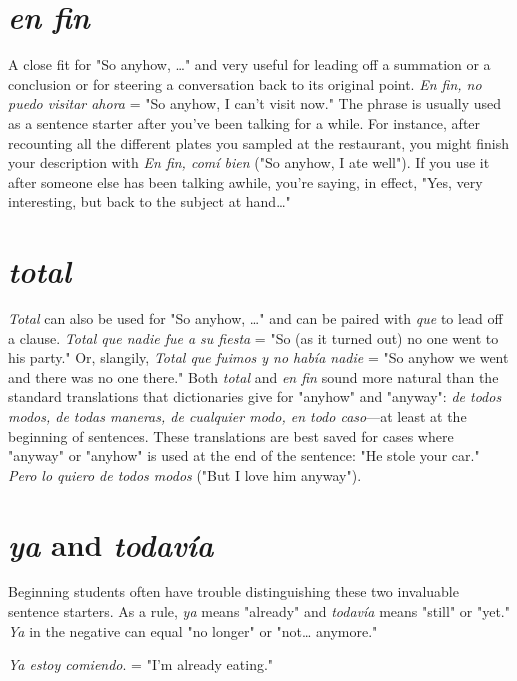 \section{\emph{en fin}}

A close fit for "So anyhow, \ldots{}" and very useful for leading off
a summation or a conclusion or for steering a conversation back to its
original point. \emph{En fin, no puedo visitar ahora} = "So anyhow, I can't
visit now." The phrase is usually used as a sentence starter after you've
been talking for a while. For instance, after recounting all the different
plates you sampled at the restaurant, you might finish your description
with \emph{En fin, comí bien} ("So anyhow, I ate well"). If you use it after
someone else has been talking awhile, you're saying, in effect, "Yes,
very interesting, but back to the subject at hand\ldots{}"

\section{\emph{total}}

\emph{Total} can also be used for "So anyhow, \ldots{}" and can be paired
with \emph{que} to lead off a clause. \emph{Total que nadie fue a su fiesta} = "So (as
it turned out) no one went to his party." Or, slangily, \emph{Total que fuimos
y no había nadie} = "So anyhow we went and there was no one there."
Both \emph{total} and \emph{en fin} sound more natural than the standard translations that dictionaries give for "anyhow" and "anyway": \emph{de todos modos, de todas maneras, de cualquier modo, en todo caso}---at least at
the beginning of sentences. These translations are best saved for cases
where "anyway" or "anyhow" is used at the end of the sentence:
"He stole your car." \emph{Pero lo quiero de todos modos} ("But I love him
anyway").

\section{\emph{ya} and \emph{todavía}}

Beginning students often have trouble distinguishing these
two invaluable sentence starters. As a rule, \emph{ya} means "already" and \emph{todavía} means "still" or "yet." \emph{Ya} in the negative can equal "no longer"
or "not\ldots{} anymore."

\bsk

\indu \emph{Ya estoy comiendo}. = "I'm already eating."

